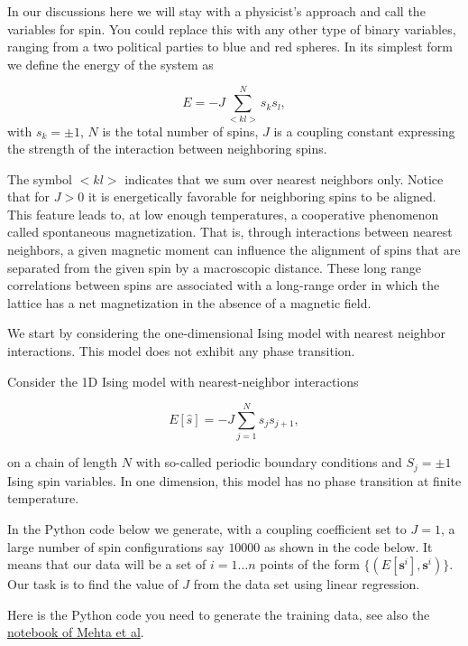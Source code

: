 \documentclass[%
oneside,                 %
final,                   %
10pt]{article}
\begin{document}
In our discussions here we will stay with a physicist's approach and
call the variables for spin. You could replace this with any other
type of binary variables, ranging from a two political parties to blue
and red spheres.  In its simplest form we define the energy of the
system as

\begin{equation*}
  E=-J\sum_{<kl>}^{N}s_ks_l,
\end{equation*}
with  $s_k=\pm 1$, $N$ is the total number of spins,
$J$ is a coupling constant expressing the strength of the interaction
between neighboring spins.

The symbol $<kl>$ indicates that we sum over nearest
neighbors only.
Notice that for $J>0$ it is energetically favorable for neighboring spins
to be aligned. This feature leads to, at low enough temperatures,
a cooperative phenomenon called spontaneous magnetization. That is,
through interactions between nearest neighbors, a given magnetic
moment can influence the alignment of spins  that are separated
from the given spin by a macroscopic distance. These long range correlations
between spins are associated with a long-range order in which
the lattice has a net magnetization in the absence of a magnetic field.

We start by considering the one-dimensional Ising model with nearest neighbor interactions. This model does not exhibit any phase transition.

Consider the 1D Ising model with nearest-neighbor interactions 

\begin{equation*}
  E[\hat{s}]=-J\sum_{j=1}^{N}s_{j}s_{j+1},
\end{equation*}

on a chain of length $N$ with so-called periodic boundary conditions and $S_j=\pm 1$ Ising spin variables.
In one dimension, this model has no phase transition at finite temperature.

In the Python code below we generate, with a coupling coefficient set to $J=1$, a large number of spin configurations say $10000$ as shown in the code below.
It means that our data will be a set of $i=1\ldots n$ points of the form
$\{(E[\boldsymbol{s}^i],\boldsymbol{s}^i)\}$.
Our task is to find the value of $J$ from the data set using linear regression.

Here is the Python code you need to generate the training data, see
also the \href{{https://physics.bu.edu/~pankajm/ML-Notebooks/HTML/NB_CVI-linreg_ising.html}}{notebook of Mehta et
al}.
\end{document}
